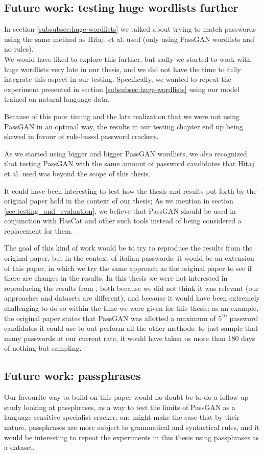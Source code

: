 \subsection{Future work: testing huge wordlists further}
In section \ref{subsubsec:huge-wordlists} we talked about trying to match passwords using the same method as Hitaj. et al. used (only using PassGAN wordlists and no rules).\\
We would have liked to explore this further, but sadly we started to work with huge wordlists very late in our thesis, and we did not have the time to fully integrate this aspect in our testing. Specifically, we wanted to repeat the experiment presented in section \ref{subsubsec:huge-wordlists} using our model trained on natural language data.

Because of this poor timing and the late realization that we were not using PassGAN in an optimal way, the results in our testing chapter end up being skewed in favour of rule-based password crackers.

As we started using bigger and bigger PassGAN wordlists, we also recognized that testing PassGAN with the same amount of password candidates that Hitaj. et al. used was beyond the scope of this thesis. 

It could have been interesting to test how the thesis and results put forth by the original paper hold in the context of our thesis; As we mention in section \ref{sec:testing_and_evaluation}, we believe that PassGAN should be used in conjunction with HasCat and other such tools instead of being considered a replacement for them.

The goal of this kind of work would be to try to reproduce the results from the original paper, but in the context of italian passwords: it would be an extension of this paper, in which we try the same approach as the original paper to see if there are changes in the results.
In this thesis we were not interested in reproducing the results from \cite{PassGAN}, both because we did not think it was relevant (our approaches and datasets are different), and because it would have been extremely challenging to do so within the time we were given for this thesis: as an example, the original paper states that PassGAN was allotted a maximum of $5^{10}$ password candidates it could use to out-perform all the other methods: to just sample that many passwords at our current rate, it would have taken us more than 180 days of nothing but sampling.

\subsection{Future work: passphrases} 
Our favourite way to build on this paper would no doubt be to do a follow-up study looking at passphrases, as a way to test the limits of PassGAN as a language-sensitive specialist cracker: one might make the case that by their nature, passphrases are more subject to grammatical and syntactical rules, and it would be interesting to repeat the experiments in this thesis using passphrases as a dataset.

